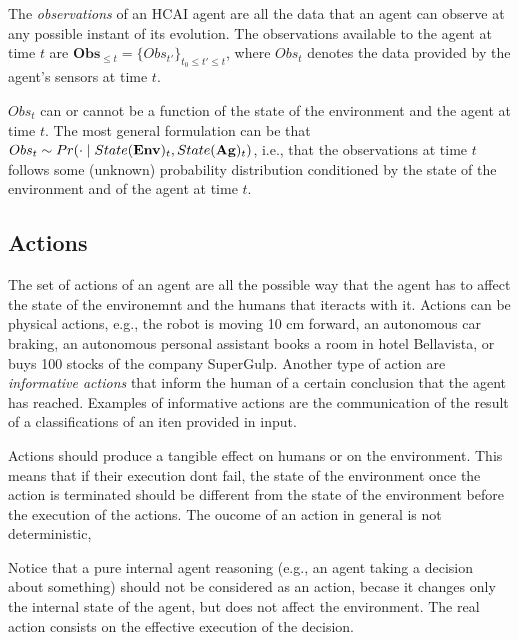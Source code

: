 \def\observations{\mathbf{Obs}}
\def\observation{Obs}

\begin{definition}
The \emph{observations} of an HCAI agent are all the data that an agent
can observe at any possible instant of its evolution. The observations
available to the agent at time $t$ are $\observations_{\leq t}=\{\observation_{t'}\}_{t_0\leq t'\leq t}$,
where $\observation_t$ denotes the data provided by the agent's sensors at
time $t$. 
\end{definition}

$\observation_t$ can or cannot be a function of the state of the environment
and the agent at time $t$. The most general formulation can be that
$\observation_t\sim Pr(\cdot\mid\environmentState_t,\agentState_t)$,
i.e., that the observations at time $t$ follows some (unknown)
probability distribution conditioned by the state of the environment and of the
agent at time $t$. 


\def\actions{\mathcal{A}}
\subsection{Actions}

The set of actions of an agent are all the possible way that the agent
has to affect the state of the environemnt and the humans that
iteracts with it. Actions can be physical actions, e.g., the robot is
moving 10 cm forward, an autonomous car braking, an autonomous
personal assistant books a room in hotel Bellavista, or buys 100
stocks of the company SuperGulp.  Another type of action are
\emph{informative actions} that inform the human of a certain
conclusion that the agent has reached. Examples of informative actions
are the communication of the result of a classifications of an iten
provided in input.

Actions should produce a tangible effect on humans or on the
environment. This means that if their execution dont fail, the state
of the environment once the action is terminated should be different
from the state of the environment before the execution of the
actions. The oucome of an action in general is not deterministic,

Notice that a pure internal agent reasoning (e.g., an agent
taking a decision about something) should not be considered as an
action, becase it changes only the internal state of the agent, but
does not affect the environment. The real action consists on the
effective execution of the decision.

